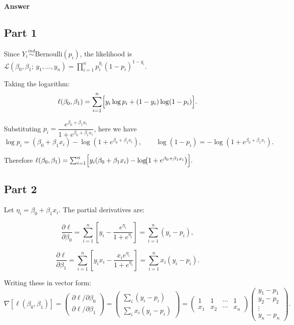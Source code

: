 \documentclass[letterpaper]{article}
\begin{document}
	\textbf{Answer}

		\subsection{Part 1}
		
		Since $Y_i \overset{ind}{\sim} \text{Bernoulli}(p_i)$, the likelihood is 
		$
		\mathcal{L}(\beta_0,\beta_1;\,y_1,\ldots,y_n)
		= \prod_{i=1}^n p_i^{y_i}(1-p_i)^{1-y_i}.
		$
		
		Taking the logarithm:
		\[
		\ell(\beta_0,\beta_1)
		= \sum_{i=1}^n \Bigl[y_i\log p_i + (1-y_i)\log(1-p_i)\Bigr].
		\]
		
		Substituting $p_i = \dfrac{e^{\beta_0+\beta_1 x_i}}{1+e^{\beta_0+\beta_1 x_i}}$,
		here we have
		\[
		\log p_i = (\beta_0+\beta_1 x_i) - \log(1+e^{\beta_0+\beta_1 x_i}),
		\qquad
		\log(1-p_i) = -\log(1+e^{\beta_0+\beta_1 x_i}).
		\]
		
		Therefore $
		{
			\ell(\beta_0,\beta_1)
			= \sum_{i=1}^n \Bigl[y_i(\beta_0+\beta_1 x_i)
			- \log\!\bigl(1+e^{\beta_0+\beta_1 x_i}\bigr)\Bigr].
		}
		$
		
		\subsection{Part 2}
		
		Let $\eta_i = \beta_0 + \beta_1 x_i$. The partial derivatives are:
		
		\[
		\frac{\partial \ell}{\partial \beta_0}
		= \sum_{i=1}^n \left[y_i - \frac{e^{\eta_i}}{1+e^{\eta_i}}\right]
		= \sum_{i=1}^n (y_i - p_i),
		\]
		
		\[
		\frac{\partial \ell}{\partial \beta_1}
		= \sum_{i=1}^n \left[y_i x_i - \frac{x_i e^{\eta_i}}{1+e^{\eta_i}}\right]
		= \sum_{i=1}^n x_i(y_i - p_i).
		\]
		
		Writing these in vector form:
		\[
		\nabla[\ell(\beta_0,\beta_1)]
		= \begin{pmatrix} \partial\ell/\partial\beta_0 \\ \partial\ell/\partial\beta_1 \end{pmatrix}
		= \begin{pmatrix} \sum_i (y_i - p_i) \\ \sum_i x_i(y_i-p_i) \end{pmatrix}
		= \begin{pmatrix} 1 & 1 & \cdots & 1 \\ x_1 & x_2 & \cdots & x_n \end{pmatrix}
		\begin{pmatrix} y_1-p_1 \\ y_2-p_2 \\ \vdots \\ y_n-p_n \end{pmatrix}.
		\]
		
\end{document}
